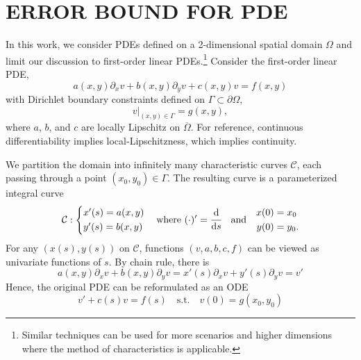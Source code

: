 \documentclass[accepted]{uai2023}
\newcommand{\ds}[1]{\cfrac{\mathrm{d} #1}{\mathrm{d} s}}
\begin{document}
\section{ERROR BOUND FOR PDE}
    In this work, we consider PDEs defined on a 2-dimensional spatial domain $\Omega$ and limit our discussion to first-order linear PDEs.\footnote{Similar techniques can be used for more scenarios and higher dimensions where the method of characteristics is applicable.} 
    Consider the first-order linear PDE,
    { 
        \small
        \begin{equation}\label{eq:pde-master}
            a(x, y) \partial_x v + b(x, y) \partial_y v + c(x, y)v = f(x, y)
        \end{equation}
    }
    with Dirichlet boundary constraints defined on $\Gamma \subset \partial \Omega$,
    {
        \small
        \begin{equation}\label{eq:pde-bc-master}
            v\big|_{(x, y) \in \Gamma} = g(x, y),
        \end{equation}
    }
    where $a$, $b$, and $c$ are locally Lipschitz on $\overline\Omega$. For reference, continuous differentiability implies local-Lipschitzness, which implies continuity.

    We partition the domain into infinitely many characteristic curves $\mathcal{C}$, each passing through a point $(x_0, y_0) \in \Gamma$. The resulting curve is a parameterized integral curve 
    {
        \small
        \begin{equation*} 
            \mathcal{C}: \begin{cases*}
                x'(s) = a(x, y) \\
                y'(s) = b(x, y) 
            \end{cases*} 
            \quad
            \text{where}
            \,\,
            (\cdot)' = \ds{}
            \quad
            \text{and} 
            \quad
            \begin{aligned}
                x(0) &= x_0 \\
                y(0) &= y_0.
            \end{aligned}
        \end{equation*}
    }
    For any $(x(s), y(s))$ on $\mathcal{C}$, functions $(v, a, b, c, f)$ can be viewed as univariate functions of $s$. By chain rule, there is
    {
        \small
        \begin{equation*}
            a(x, y)\partial_x v + b(x, y)\partial_y v = x'(s)\partial_x v  + y'(s)\partial_y v = v'
        \end{equation*}
    }
    Hence, the original PDE can be reformulated as an ODE
    {
        \small
        \begin{equation}
            v' + c(s)v = f(s) \quad \text{s.t.} \quad v(0) = g(x_0, y_0)
        \end{equation}
    }
\end{document}
